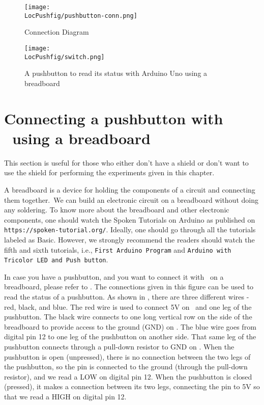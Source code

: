 \begin{figure}
\centering
\texttt{[image: \\LocPushfig/pushbutton-conn.png]}
\caption{Connection Diagram}
\label{fig:pushbuttonconn}
\end{figure}


\begin{figure}
  \centering
  \texttt{[image: \\LocPushfig/switch.png]}
  \caption{A pushbutton to read its status with Arduino Uno using a breadboard}
  \label{fig:switch-bread}
\end{figure}

\section{Connecting a pushbutton with \arduino\ using a breadboard}
This section is useful for those who either don't have a shield or don't want to use the shield
for performing the experiments given in this chapter. 

A breadboard is a device for holding the components of a circuit and connecting 
them together. We can build an electronic circuit on a breadboard without doing any 
soldering. To know more about the breadboard and other electronic components, 
one should watch the Spoken Tutorials on Arduino as published on
{\tt https://spoken-tutorial.org/}. Ideally, one should go through all the
tutorials labeled as Basic. However, we strongly recommend the readers should
watch the fifth and sixth tutorials, i.e., {\tt First Arduino Program} and 
{\tt Arduino with Tricolor LED and Push button}.

In case you have a pushbutton, and you want to connect it with \arduino\ on a breadboard, 
please refer to . The connections given in this figure can be used to 
read the status of a pushbutton. As shown in , 
there are three different wires - red, black, and blue. The red wire is used to connect 5V on 
\arduino\ and one leg of the pushbutton. The black wire connects to one long vertical row on 
the side of the breadboard to provide access to the ground (GND) on \arduino. 
The blue wire goes from digital pin 12 to one leg of the pushbutton on another side. 
That same leg of the pushbutton connects through a pull-down resistor to GND on \arduino. 
When the pushbutton is open (unpressed), there is no connection between the two legs of the pushbutton, 
so the pin is connected to the ground (through the pull-down resistor), and we read a LOW on
digital pin 12. When the pushbutton is closed (pressed), it makes a connection between its two legs, 
connecting the pin to 5V so that we read a HIGH on digital pin 12. 

